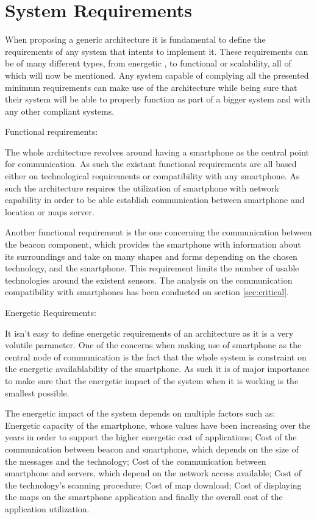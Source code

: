 \section{System Requirements}
\label{sec:requirements}

When proposing a generic architecture it is fundamental to define the requirements of any system that intents to implement it. These requirements can be of many different types, from energetic , to functional or scalability, all of which will now be mentioned. Any system capable of complying all the presented minimum requirements can make use of the architecture while being sure that their system will be able to properly function as part of a bigger system and with any other compliant systems. 

Functional requirements:

The whole architecture revolves around having a smartphone as the central point for communication. As such the existant functional requirements are all based either on technological requirements  or compatibility with any smartphone. As such the architecture requires the utilization of smartphone with network capability in order to be able establish communication between smartphone and location or maps server.

Another functional requirement is the one concerning the communication between the beacon component, which provides the smartphone with information about its surroundings and take on many shapes and forms depending on the chosen technology, and the smartphone. This requirement limits the number of usable technologies around the existent sensors. The analysis on the communication compatibility with smartphones has been conducted on section \ref{sec:critical}.


Energetic Requirements:

It isn't easy to define energetic requirements of an architecture as it is a very volutile parameter. One of the concerns when making use of smartphone as the central node of communication is the fact that the whole system is constraint on the energetic availablability of the smartphone. As such it is of major importance to make sure that the energetic impact of the system when it is working is the smallest possible.

The energetic impact of the system depends on multiple factors such as: Energetic capacity of the smartphone, whose values have been increasing over the years in order to support the higher energetic cost of applications; Cost of the communication between beacon and smartphone, which depends on the size of the messages and the technology; Cost of the communication between smartphone and servers, which depend on the network access available; Cost of the technology's scanning procedure; Cost of map download; Cost of displaying the maps on the smartphone application and finally the overall cost of the application utilization.

